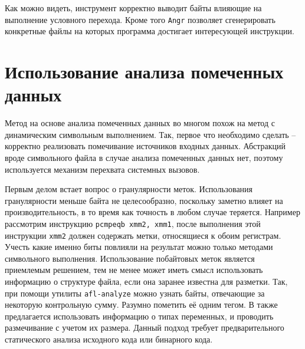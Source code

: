 Как можно видеть, инструмент корректно выводит байты влияющие на выполнение условного перехода. Кроме того \texttt{Angr} позволяет сгенерировать конкретные файлы на которых программа достигает интересующей инструкции.







\section{Использование анализа помеченных данных}
\label{taintmethod}

Метод на основе анализа помеченных данных во многом похож на метод с динамическим символьным выполнением. Так, первое что необходимо сделать -- корректно реализовать помечивание источников входных данных. Абстракций вроде символьного файла в случае анализа помеченных данных нет, поэтому используется механизм перехвата системных вызовов.

Первым делом встает вопрос о гранулярности меток. Использования гранулярности меньше байта не целесообразно, поскольку заметно влияет на производительность, в то время как точность в любом случае теряется. Например рассмотрим инструкцию \texttt{pcmpeqb xmm2, xmm1}, после выполнения этой инструкции \texttt{xmm2} должен содержать метки, относящиеся к обоим регистрам. Учесть какие именно биты повлияли на результат можно только методами символьного выполнения.
Использование побайтовых меток является приемлемым решением, тем не менее может иметь смысл использовать информацию о структуре файла, если она заранее известна для разметки. Так, при помощи утилиты \texttt{afl-analyze} можно узнать байты, отвечающие за некоторую контрольную сумму. Разумно пометить её одним тегом. В \cite{Angora} также предлагается использовать информацию о типах переменных, и проводить размечивание с учетом их размера. Данный подход требует предварительного статического анализа исходного кода или бинарного кода.


